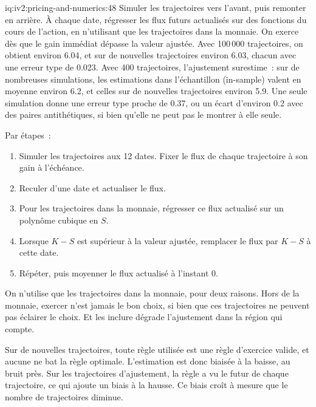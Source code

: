 \begin{solution}{iq:iv2:pricing-and-numerics:48}
Simuler les trajectoires vers l'avant, puis remonter en arrière. À chaque date, régresser les flux futurs actualisés sur des fonctions du cours de l'action, en n'utilisant que les trajectoires dans la monnaie. On exerce dès que le gain immédiat dépasse la valeur ajustée. Avec 100\,000 trajectoires, on obtient environ 6.04, et sur de nouvelles trajectoires environ 6.03, chacun avec une erreur type de 0.023. Avec 400 trajectoires, l'ajustement surestime~: sur de nombreuses simulations, les estimations dans l'échantillon (in-sample) valent en moyenne environ 6.2, et celles sur de nouvelles trajectoires environ 5.9. Une seule simulation donne une erreur type proche de 0.37, ou un écart d'environ 0.2 avec des paires antithétiques, si bien qu'elle ne peut pas le montrer à elle seule.

Par étapes~:
\begin{enumerate}
\item Simuler les trajectoires aux 12 dates. Fixer le flux de chaque trajectoire à son gain à l'échéance.
\item Reculer d'une date et actualiser le flux.
\item Pour les trajectoires dans la monnaie, régresser ce flux actualisé sur un polynôme cubique en $S$.
\item Lorsque $K - S$ est supérieur à la valeur ajustée, remplacer le flux par $K - S$ à cette date.
\item Répéter, puis moyenner le flux actualisé à l'instant 0.
\end{enumerate}

On n'utilise que les trajectoires dans la monnaie, pour deux raisons. Hors de la monnaie, exercer n'est jamais le bon choix, si bien que ces trajectoires ne peuvent pas éclairer le choix. Et les inclure dégrade l'ajustement dans la région qui compte.

Sur de nouvelles trajectoires, toute règle utilisée est une règle d'exercice valide, et aucune ne bat la règle optimale. L'estimation est donc biaisée à la baisse, au bruit près. Sur les trajectoires d'ajustement, la règle a vu le futur de chaque trajectoire, ce qui ajoute un biais à la hausse. Ce biais croît à mesure que le nombre de trajectoires diminue.

\end{solution}

